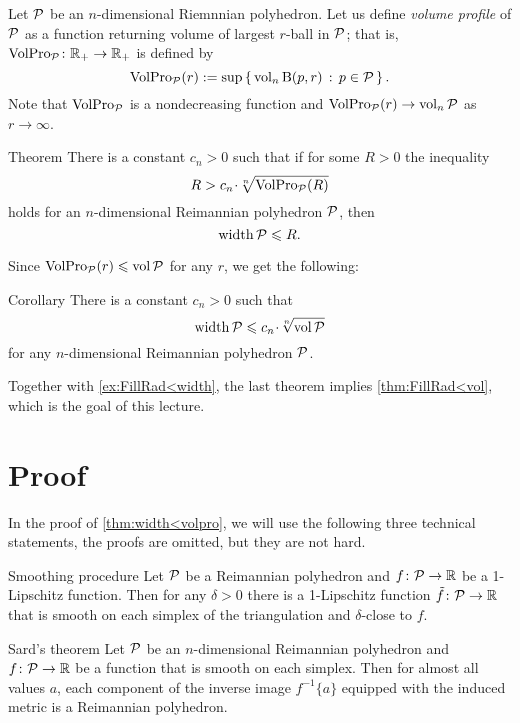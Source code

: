 Let $\mathcal{P}$ be an $n$-dimensional Riemnnian polyhedron.
Let us define \emph{volume profile} of $\mathcal{P}$ as a function 
returning volume of largest $r$-ball in $\mathcal{P}$;
that is, $\operatorname{\rm VolPro}\nolimits_{\mathcal{P}}\colon\mathbb{R}_+\to\mathbb{R}_+$ is defined by 
\[\operatorname{\rm VolPro}\nolimits_{\mathcal{P}}(r)\mathrel{:=} \sup\left\{\,{\operatorname{\rm vol}\nolimits_n \mathrm{B}{}(p,r)}\,:\,{p\in\mathcal{P}}\,\right\}.\]
Note that $\operatorname{\rm VolPro}\nolimits_{\mathcal{P}}$ is a nondecreasing function and $\VolPro_{\spc{P}}(r)\z\to\vol_n\spc{P}$ as $r\to\infty$.

\begin{thm}{Theorem}\label{thm:width<volpro}
There is a constant $c_n>0$ such that if for some $R>0$
the inequality 
\[R> c_n\cdot \sqrt[n]{\VolPro_{\spc{P}}(R)}\]
holds for an $n$-dimensional Reimannian polyhedron
$\mathcal{P}$, then 
\[\operatorname{\rm width}\nolimits\mathcal{P}\leqslant  R.\]
\end{thm}

Since $\operatorname{\rm VolPro}\nolimits_{\mathcal{P}}(r)\leqslant \operatorname{\rm vol}\nolimits\mathcal{P}$ for any $r$,
we get the following:

\begin{thm}{Corollary}\label{thm:width<vol}
There is a constant $c_n>0$ such that 
\[\width\spc{P}\le c_n\cdot \sqrt[n]{\vol\spc{P}}\] 
for any  $n$-dimensional Reimannian polyhedron $\mathcal{P}$.
\end{thm}

Together with \ref{ex:FillRad<width}, the last theorem implies \ref{thm:FillRad<vol}, which is the goal of this lecture.

\section*{Proof}

In the proof of \ref{thm:width<volpro}, we will use the following three technical statements,
the proofs are omitted, but they are not hard. 

\begin{thm}{Smoothing procedure}
Let $\mathcal{P}$ be a Reimannian polyhedron and $f\colon\mathcal{P}\to \mathbb{R}$ be a 1-Lipschitz function.
Then for any $\delta>0$ there is a  1-Lipschitz function $\tilde f\colon\mathcal{P}\to \mathbb{R}$ that is smooth on each simplex of the triangulation and $\delta$-close to $f$.
\end{thm}

\begin{thm}{Sard's theorem}
Let $\mathcal{P}$ be an $n$-dimensional Reimannian polyhedron and $f\colon\mathcal{P}\to \mathbb{R}$ be a function that is smooth on each simplex.
Then for almost all values $a$, each component of the inverse image $f^{-1}\{a\}$ equipped with the induced metric is a Reimannian polyhedron.
\end{thm}


